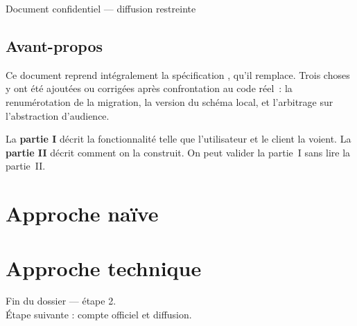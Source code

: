 \documentclass[11pt,a4paper,oneside]{report}
\begin{document}
\begin{titlepage}
\vspace{0.8cm}
\begin{center}\color{AlanyaGray}\small\sffamily
  Document confidentiel --- diffusion restreinte
\end{center}
\end{titlepage}

\chapter*{Avant-propos}
\thispagestyle{plain}

Ce document reprend intégralement la spécification ,
qu'il remplace. Trois choses y ont été ajoutées ou corrigées après confrontation au code
réel~: la renumérotation de la migration, la version du schéma local, et l'arbitrage sur
l'abstraction d'audience.

\begin{note}
La \textbf{partie I} décrit la fonctionnalité telle que l'utilisateur et le client la
voient. La \textbf{partie II} décrit comment on la construit. On peut valider la partie~I
sans lire la partie~II.
\end{note}

\tableofcontents

\part{Approche naïve}



\part{Approche technique}



\vfill
\begin{center}\small\color{AlanyaGray}\sffamily
Fin du dossier --- étape 2. \\
Étape suivante : compte officiel et diffusion.
\end{center}
\end{document}
